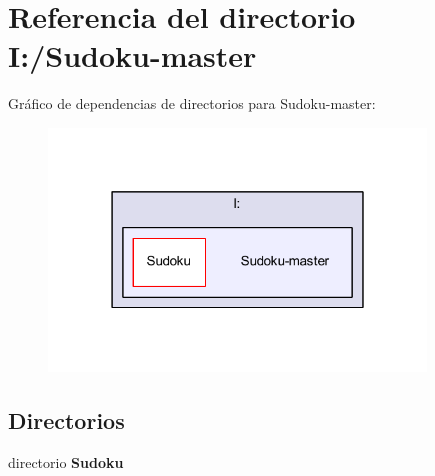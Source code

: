 \section{Referencia del directorio I\-:/\-Sudoku-\/master}
\label{dir_879fe5ab0b34169c6af71fefe67d8479}
Gráfico de dependencias de directorios para Sudoku-\/master\-:
\nopagebreak
\begin{figure}[H]
\begin{center}
\leavevmode
\includegraphics[width=284pt]{dir_879fe5ab0b34169c6af71fefe67d8479_dep}
\end{center}
\end{figure}
\subsection*{Directorios}
\begin{DoxyCompactItemize}
\item 
directorio {\bf Sudoku}
\end{DoxyCompactItemize}
